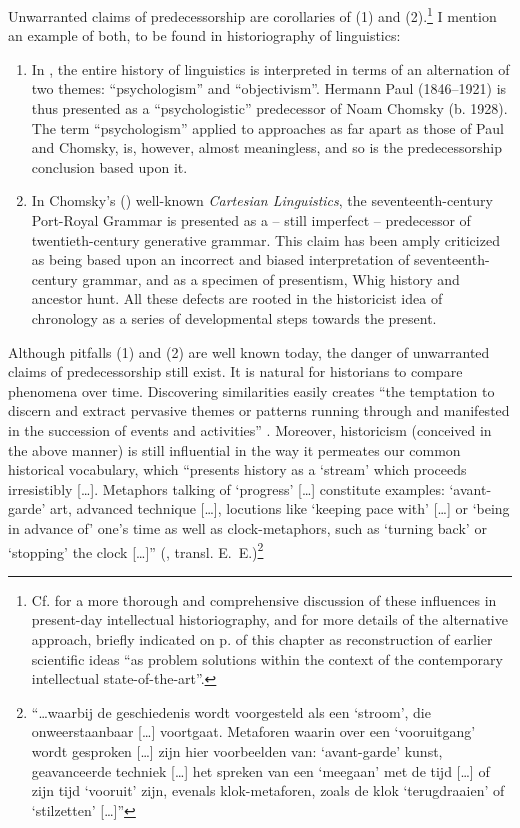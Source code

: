 \documentclass[output=paper]{langscibook}
\begin{document}
Unwarranted claims of predecessorship are corollaries of (1) and (2).\footnote{Cf. \citet[chaps. 2 \& 3]{Elffers1991} for a more thorough and comprehensive discussion of these influences in present-day intellectual historiography, and for more details of the alternative approach, briefly indicated on p. \pageref{q:elffers:probsols} of this chapter as reconstruction of earlier scientific ideas ``as problem solutions within the context of the contemporary intellectual state-of-the-art''.} I mention an example of both, to be found in historiography of linguistics:

\begin{enumerate}

\item[Ad 1.] In \citet{Antal1984}, the entire history of linguistics is interpreted in terms of an alternation of  two themes: ``psychologism'' and ``objectivism''. Hermann Paul (1846--1921) is thus presented as a ``psychologistic'' predecessor of Noam Chomsky (b. 1928). The term ``psychologism'' applied to approaches as far apart as those of Paul and Chomsky, is, however, almost meaningless, and so is the predecessorship conclusion based upon it.

\item[Ad 2.] In Chomsky’s (\citeyear{Chomsky20091966}) well-known \emph{Cartesian Linguistics}, the seventeenth-century Port-Royal Grammar is presented as a -- still imperfect -- predecessor of twentieth-century generative grammar. This claim has been amply criticized as being based upon an incorrect and biased interpretation of seven\-teenth-century grammar, and as a specimen of presentism, Whig history and ancestor hunt. All these defects are rooted in the historicist idea of chronology as a series of developmental steps towards the present. 

\end{enumerate}

Although pitfalls (1) and (2) are well known today, the danger of unwarranted claims of predecessorship still exist. It is natural for historians to compare phenomena over time. Discovering similarities easily creates ``the temptation to discern and extract pervasive themes or patterns running through and manifested in the succession of events and activities'' \citep[7--8]{Robins1997}. Moreover, historicism (conceived in the above manner) is still influential in the way it permeates our common historical vocabulary, which ``presents history as a `stream' which proceeds irresistibly […]. Metaphors talking of `progress' […] constitute examples: `avant-garde' art, advanced technique […], locutions like `keeping pace with' […] or `being in advance of' one's time as well as clock-metaphors, such as `turning back' or `stopping' the clock […]'' (\citealt[131]{Dussen1986}, transl. E.~E.)\footnote{``…waarbij de geschiedenis wordt voorgesteld als een `stroom', die onweerstaanbaar […] voortgaat. Metaforen waarin over een `vooruitgang' wordt gesproken […] zijn hier voorbeelden van: `avant-garde' kunst, geavanceerde techniek […] het spreken van een `meegaan' met de tijd […] of zijn tijd `vooruit' zijn, evenals klok-metaforen, zoals de klok `terugdraaien' of `stilzetten' […]''}
\end{document}
